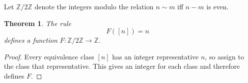 \documentclass{article}
\newtheorem{theorem}{Theorem}
\begin{document}
Let $\mathbb Z/2\mathbb Z$ denote the integers modulo the relation
$n\sim m$ iff $n-m$ is even.

\begin{theorem}\label{thm:quotient-bad}
The rule
\[
  F([n])=n
\]
defines a function $F:\mathbb Z/2\mathbb Z\to\mathbb Z$.
\end{theorem}
\begin{proof}
Every equivalence class $[n]$ has an integer representative $n$, so assign
to the class that representative. This gives an integer for each class and
therefore defines $F$.
\end{proof}
\end{document}
